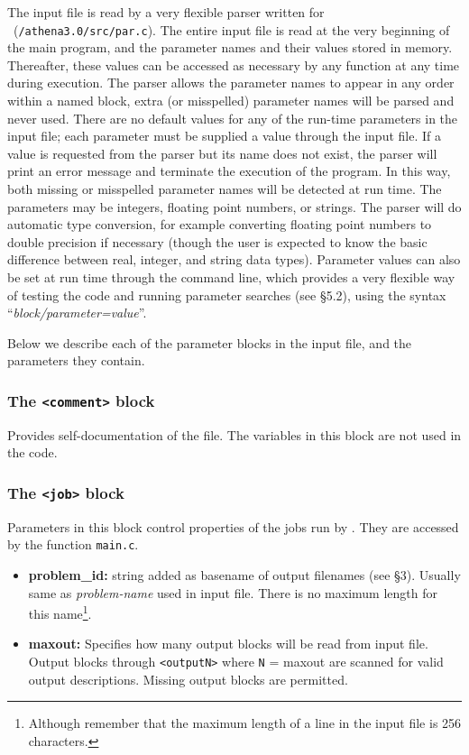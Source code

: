 The input file is read by a very flexible parser written for \ath\
({\tt /athena3.0/src/par.c}).  The entire input file is read at the
very beginning of the main program, and the parameter names and their
values stored in memory.  Thereafter, these values can be accessed as
necessary by any function at any time during execution.  The parser
allows the parameter names to appear in any order within a named
block, extra (or misspelled) parameter names will be parsed and never
used.  There are no default values for any of the run-time parameters
in the input file; each parameter must be supplied a value through the
input file.  If a value is requested from the parser but its name does
not exist, the parser will print an error message and terminate the
execution of the program.  In this way, both missing or misspelled
parameter names will be detected at run time.  The parameters may be
integers, floating point numbers, or strings.  The parser will do
automatic type conversion, for example converting floating point
numbers to double precision if necessary (though the user is expected
to know the basic difference between real, integer, and string data
types).  Parameter values can also be set at run time through the
command line, which provides a very flexible way of testing the code
and running parameter searches (see \S 5.2),
using the syntax ``{\it block/parameter=value}''.

Below we describe each of the parameter blocks in the input file,
and the parameters they contain.

\subsubsection{The {\tt <comment>} block}

Provides self-documentation of the file.  The variables in this block
are not used in the code.

\subsubsection{The {\tt <job>} block}

Parameters in this block control properties of the jobs run by \ath.
They are accessed by the function {\tt main.c}.
\begin{itemize}
\item {\bf problem\_id:}
string added as basename of output filenames (see \S 3).  Usually same
as {\it problem-name} used in input file.  There is no maximum length
for this name\footnote{Although remember that the maximum length of a
line in the input file is 256 characters.}.
\item {\bf maxout:} Specifies how many output blocks will be read from
input file.  Output
blocks {\tt<output1>} through {\tt<outputN>} where {\tt N} = maxout
are scanned for valid output descriptions.  Missing output
blocks are permitted.
\end{itemize}

